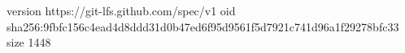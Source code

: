 version https://git-lfs.github.com/spec/v1
oid sha256:9fbfc156c4ead4d8ddd31d0b47ed6f95d9561f5d7921c741d96a1f29278bfc33
size 1448
